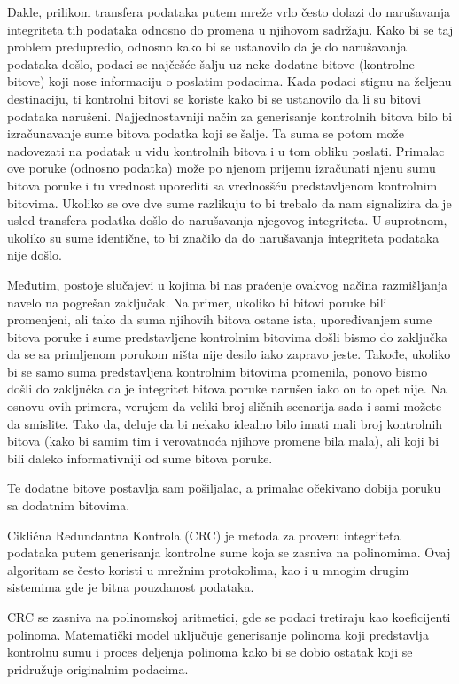 \documentclass[12pt,oneside]{memoir}
\begin{document}
Dakle, prilikom transfera podataka putem mreže vrlo često dolazi do narušavanja 
integriteta tih podataka odnosno do promena u njihovom sadržaju. Kako bi se taj 
problem predupredio, odnosno kako bi se ustanovilo da je do narušavanja podataka 
došlo, podaci se najčešće šalju uz neke dodatne bitove (kontrolne bitove) koji 
nose informaciju o poslatim podacima. Kada podaci stignu na željenu 
destinaciju, ti kontrolni bitovi se koriste kako bi se ustanovilo da li su 
bitovi podataka narušeni. Najjednostavniji način za generisanje 
kontrolnih bitova bilo bi izračunavanje sume bitova podatka koji se šalje. Ta 
suma se potom može nadovezati na podatak u vidu kontrolnih bitova i u tom obliku 
poslati. Primalac ove poruke (odnosno podatka) može po njenom prijemu izračunati 
njenu sumu bitova poruke i tu vrednost uporediti sa vrednosšću predstavljenom kontrolnim bitovima. 
Ukoliko se ove dve sume razlikuju to bi trebalo da nam signalizira da je usled transfera podatka 
došlo do narušavanja njegovog integriteta. U suprotnom, ukoliko su sume identične, to 
bi značilo da do narušavanja integriteta podataka nije došlo.

Međutim, postoje slučajevi u kojima bi nas praćenje ovakvog načina razmišljanja 
navelo na pogrešan zaključak. Na primer, ukoliko bi bitovi poruke bili promenjeni, 
ali tako da suma njihovih bitova ostane ista, upoređivanjem sume bitova poruke i 
sume predstavljene kontrolnim bitovima došli bismo do zaključka da se sa primljenom 
porukom ništa nije desilo iako zapravo jeste. Takođe, ukoliko bi se samo suma 
predstavljena kontrolnim bitovima promenila, ponovo bismo došli do zaključka da je 
integritet bitova poruke narušen iako on to opet nije. Na osnovu ovih primera, 
verujem da veliki broj sličnih scenarija sada i sami možete da smislite. Tako da, 
deluje da bi nekako idealno bilo imati mali broj kontrolnih bitova (kako bi samim 
tim i verovatnoća njihove promene bila mala), ali koji bi bili daleko 
informativniji od sume bitova poruke. 

Te dodatne bitove postavlja sam pošiljalac, a primalac očekivano dobija poruku sa dodatnim bitovima.


Ciklična Redundantna Kontrola (CRC) je metoda za proveru integriteta podataka putem generisanja kontrolne sume koja se zasniva na polinomima. Ovaj algoritam se često koristi u mrežnim protokolima, kao i u mnogim drugim sistemima gde je bitna pouzdanost podataka.

CRC se zasniva na polinomskoj aritmetici, gde se podaci tretiraju kao koeficijenti polinoma. Matematički model uključuje generisanje polinoma koji predstavlja kontrolnu sumu i proces deljenja polinoma kako bi se dobio ostatak koji se pridružuje originalnim podacima.
\end{document}
